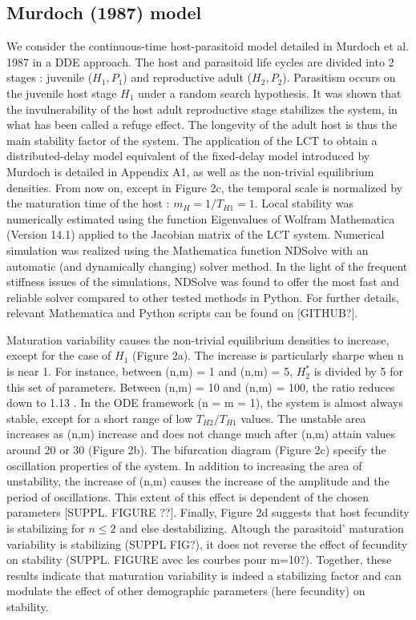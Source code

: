 \documentclass[12pt,a4paper,onecolumn]{article}
\begin{document}
\subsection{Murdoch (1987) model}
\tabto{1 cm} We consider the continuous-time host-parasitoid model detailed in Murdoch et al. 1987 in a DDE approach. The host and parasitoid life cycles are divided into 2 stages : juvenile ($H_1, P_1$) and reproductive adult ($H_2, P_2$). Parasitism occurs on the juvenile host stage $H_1$ under a random search hypothesis.  It was shown that the invulnerability of the host adult reproductive stage stabilizes the system, in what has been called a refuge effect. The longevity of the adult host is thus the main stability factor of the system.  The application of the LCT to obtain a distributed-delay model equivalent of the fixed-delay model introduced by Murdoch is detailed in Appendix A1, as well as the non-trivial equilibrium densities. From now on, except in Figure 2c, the temporal scale is normalized by the maturation time of the host : $m_H = 1/T_{H1} = 1$.
\tabto{1 cm} Local stability was numerically estimated using the function Eigenvalues of Wolfram Mathematica (Version 14.1) applied to the Jacobian matrix of the LCT system. Numerical simulation was realized using the Mathematica function NDSolve with an automatic (and dynamically changing) solver method. In the light of the frequent stiffness issues of the simulations, NDSolve was found to offer the most fast and reliable solver compared to other tested methods in Python. For further details, relevant Mathematica and Python scripts can be found on [GITHUB?].

\tabto{1 cm} Maturation variability causes the non-trivial equilibrium densities to increase, except for the case of $H_1$ (Figure 2a). The increase is particularly sharpe when n is near 1. For instance, between (n,m) = 1 and (n,m) = 5, $H_2^*$ is divided by 5 for this set of parameters. Between (n,m) = 10 and (n,m) = 100, the ratio reduces down to 1.13 . In the ODE framework (n = m = 1), the system is almost always stable, except for a short range of low $T_{H2}/T_{H1}$ values. The unstable area increases as (n,m) increase and does not change much after (n,m) attain values around 20 or 30 (Figure 2b). The bifurcation diagram (Figure 2c) specify the oscillation properties of the system. In addition to increasing the area of unstability, the increase of (n,m) causes the increase of the amplitude and the period of oscillations. This extent of this effect is dependent of the chosen parameters [SUPPL. FIGURE ??]. Finally, Figure 2d suggests that host fecundity is stabilizing for $ n \leq 2 $ and else destabilizing. Altough the parasitoid' maturation variability is stabilizing (SUPPL FIG?), it does not reverse the effect of fecundity on stability (SUPPL. FIGURE avec les courbes pour m=10?). Together, these results indicate that maturation variability is indeed a stabilizing factor and can modulate the effect of other demographic parameters (here fecundity) on stability. 
\end{document}
